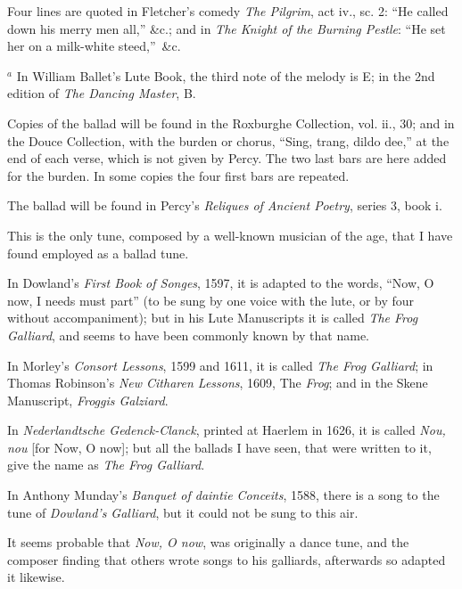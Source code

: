 Four lines are quoted in Fletcher’s comedy \textit{The Pilgrim}, act iv., sc. 2: “He
called down his merry men all,” \&c.; and in \textit{The Knight of the Burning Pestle}:
“He set her on a milk-white steed,”~\&c.


\begin{center}\scriptsize 
$^{a}$ In William Ballet’s Lute Book, the third note of the melody is E; in the 2nd edition of \textit{The Dancing Master}, B.
\end{center}

Copies of the ballad will be found in the Roxburghe Collection, vol. ii., 30;
and in the Douce Collection, with the burden or chorus, “Sing, trang, dildo dee,”
at the end of each verse, which is not given by Percy. The two last bars are
here added for the burden. In some copies the four first bars are repeated.



The ballad will be found in Percy’s \textit{Reliques of Ancient Poetry}, series 3, book i.


This is the only tune, composed by a well-known musician of the age, that
I have found employed as a ballad tune.

In Dowland’s \textit{First Book of Songes}, 1597, it is adapted to the words, “Now,
O now, I needs must part” (to be sung by one voice with the lute, or by four
without accompaniment); but in his Lute Manuscripts it is called \textit{The Frog
Galliard}, and seems to have been commonly known by that name.

In Morley’s \textit{Consort Lessons}, 1599 and 1611, it is called \textit{The Frog Galliard};
in Thomas Robinson’s \textit{New Citharen Lessons}, 1609, The \textit{Frog}; and in the Skene
Manu\-script, \textit{Froggis Galziard}.

In \textit{Nederlandtsche Gedenck-Clanck}, printed at Haerlem in 1626, it is called
\textit{Nou, nou} [for Now, O now]; but all the ballads I have seen, that were written
to it, give the name as \textit{The Frog Galliard}.

In Anthony Munday’s \textit{Banquet of daintie Conceits}, 1588, there is a song to the
tune of \textit{Dowland’s Galliard}, but it could not be sung to this air.

It seems probable that \textit{Now, O now}, was originally a dance tune, and the
composer finding that others wrote songs to his galliards, afterwards so adapted
it likewise.

